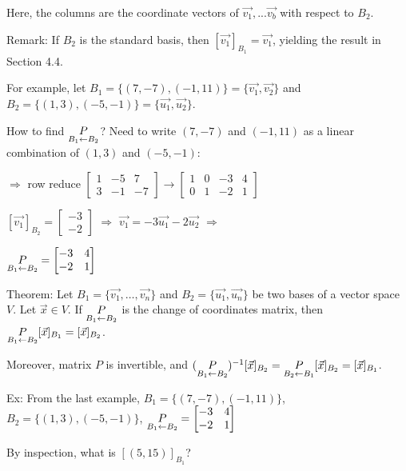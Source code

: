 \documentclass{article}
\begin{document}
Here, the columns are the coordinate vectors of $\vec{v_1}, ... \vec{v_b}$ with respect to $B_2$.

Remark: If $B_2$ is the standard basis, then $[\vec{v_1}]_{B_1} = \vec{v_1}$, yielding the result in Section 4.4.

For example, let $B_1 = \{(7,-7), (-1,11)\} = \{\vec{v_1}, \vec{v_2}\}$ and $B_2 = \{(1,3),(-5,-1)\} = \{\vec{u_1}, \vec{u_2}\}$.


How to find $\underset{B_1 \leftarrow B_2}{\large P}$? Need to write $(7,-7)$ and $(-1,11)$ as a linear combination of $(1,3)$ and $(-5,-1)$:

$\Rightarrow$ row reduce $\begin{bmatrix} 1 & -5 & 7 \\ 3 & -1 & -7 \end{bmatrix} \rightarrow \begin{bmatrix} 1 & 0 & -3 & 4 \\ 0 & 1 & -2 & 1 \end{bmatrix}$

$[\vec{v_1}]_{B_2} = \begin{bmatrix} -3 \\ -2 \end{bmatrix}$ $\Rightarrow$ $\vec{v_1} = -3\vec{u_1} - 2\vec{u_2}$ $\Rightarrow$

$\underset{B_1 \leftarrow B_2}{\large P} = \begin{bmatrix} -3 & 4 \\ -2 & 1 \end{bmatrix}$

Theorem: Let $B_1 = \{\vec{v_1}, \ldots, \vec{v_n}\}$ and $B_2 = \{\vec{u_1}, \vec{u_n}\}$ be two bases of a vector space $V$. Let $\vec{x} \in V$. If $\underset{B_1 \leftarrow B_2}{\large P}$ is the change of coordinates matrix, then $\underset{B_1 \leftarrow B_2}{\large P}[\vec{x}]_{B_1} = [\vec{x}]_{B_2}$.


Moreover, matrix $P$ is invertible, and $(\underset{B_1 \leftarrow B_2}{\large P})^{-1}[\vec{x}]_{B_2} = \underset{B_2 \leftarrow B_1}{\large P}[\vec{x}]_{B_2} = [\vec{x}]_{B_1}$.

Ex: From the last example, $B_1 = \{(7,-7), (-1,11)\}$, $B_2 = \{(1,3), (-5,-1)\}$, $\underset{B_1 \leftarrow B_2}{\large P} = \begin{bmatrix} -3 & 4 \\ -2 & 1 \end{bmatrix}$

By inspection, what is $[(5, 15)]_{B_1}$?
\end{document}
